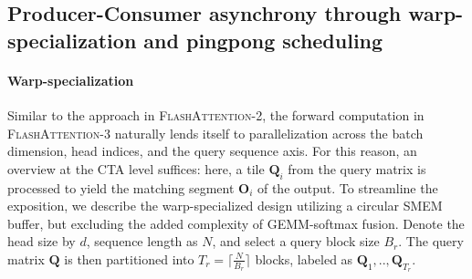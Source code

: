 \begin{enumerate}
\subsection{Producer-Consumer asynchrony through warp-specialization and pingpong scheduling}
\label{sec:algo_ws}

\paragraph{Warp-specialization}
Similar to the approach in \textsc{FlashAttention-2}, the forward computation in \textsc{FlashAttention-3} naturally lends itself to parallelization across the batch dimension, head indices, and the query sequence axis. For this reason, an overview at the CTA level suffices: here, a tile $\mathbf{Q}_i$ from the query matrix is processed to yield the matching segment $\mathbf{O}_i$ of the output. To streamline the exposition, we describe the warp-specialized design utilizing a circular SMEM buffer, but excluding the added complexity of GEMM-softmax fusion. Denote the head size by $d$, sequence length as $N$, and select a query block size $B_r$. The query matrix $\mathbf{Q}$ is then partitioned into $T_r = \lceil \frac{N}{B_r} \rceil$ blocks, labeled as $\mathbf{Q}_1, .., \mathbf{Q}_{T_r}$.


\end{enumerate}
